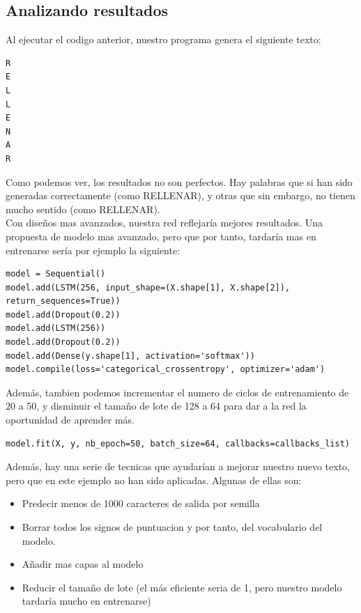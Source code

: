 \subsection{Analizando resultados}
Al ejecutar el codigo anterior, nuestro programa genera el siguiente texto:
\begin{verbatim}
R
E
L
L
E
N
A
R
\end{verbatim}
Como podemos ver, los resultados no son perfectos. Hay palabras que si han sido generadas correctamente (como RELLENAR), y otras que sin embargo, no tienen mucho sentido (como RELLENAR).\\
Con diseños mas avanzados, nuestra red reflejaría mejores resultados. Una propuesta de modelo mas avanzado, pero que por tanto, tardaría mas en entrenarse sería por ejemplo la siguiente:
\begin{verbatim}
model = Sequential()
model.add(LSTM(256, input_shape=(X.shape[1], X.shape[2]), return_sequences=True))
model.add(Dropout(0.2))
model.add(LSTM(256))
model.add(Dropout(0.2))
model.add(Dense(y.shape[1], activation='softmax'))
model.compile(loss='categorical_crossentropy', optimizer='adam')
\end{verbatim}
Además, tambien podemos incrementar el numero de ciclos de entrenamiento de 20 a 50, y disminuir el tamaño de lote de 128 a 64 para dar a la red la oportunidad de aprender más.
\begin{verbatim}
model.fit(X, y, nb_epoch=50, batch_size=64, callbacks=callbacks_list)
\end{verbatim}
Además, hay una serie de tecnicas que ayudarían a mejorar nuestro nuevo texto, pero que en este ejemplo no han sido aplicadas. Algunas de ellas son:
\begin{itemize}
\item Predecir menos de 1000 caracteres de salida por semilla
\item Borrar todos los signos de puntuacion y por tanto, del vocabulario del modelo.
\item Añadir mas capas al modelo
\item Reducir el tamaño de lote (el más eficiente seria de 1, pero nuestro modelo tardaría mucho en entrenarse)
\end{itemize}
